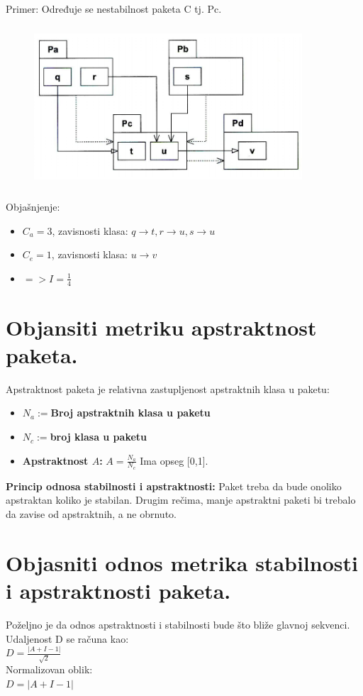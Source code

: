 \documentclass[a4paper]{article}
\begin{document}
  Primer: Određuje se nestabilnost paketa C tj. Pc.
  \begin{figure}[H]
    \begin{center}
        \includegraphics[width=100mm,height=60mm]{Slike/nestabilnost_primer.png}
    \end{center}
  \end{figure}
  Objašnjenje: 
  \begin{itemize}
    \item $C_a = 3$, zavisnosti klasa: $q \rightarrow t, r \rightarrow u, s \rightarrow u$
    \item $C_e = 1$, zavisnosti klasa: $u \rightarrow v$
    \item $=> I = \frac{1}{4}$
  \end{itemize}
  
\section{Objansiti metriku apstraktnost paketa.}
  Apstraktnost paketa je relativna zastupljenost apstraktnih klasa u paketu:
  \begin{itemize}
    \item \textbf{$N_a := $Broj apstraktnih klasa u paketu } 
    \item \textbf{$N_c := $broj klasa u paketu }
    \item \textbf{Apstraktnost $A$:} $A=\frac{N_a}{N_c}$ Ima opseg [0,1].
  \end{itemize}
  \textbf{Princip odnosa stabilnosti i apstraktnosti:} Paket treba da bude onoliko apstraktan 
  koliko je stabilan. Drugim rečima, manje apstraktni paketi bi trebalo da zavise od apstraktnih, 
  a ne obrnuto.
  
\section{Objasniti odnos metrika stabilnosti i apstraktnosti paketa.}
  Poželjno je da odnos apstraktnosti i stabilnosti bude što bliže glavnoj sekvenci. \\
  Udaljenost D se računa kao: \\
  \indent $D = \frac{|A+I-1|}{\sqrt{2}}$\\
  Normalizovan oblik:\\
  \indent $D = |A+I-1|$
\end{document}

